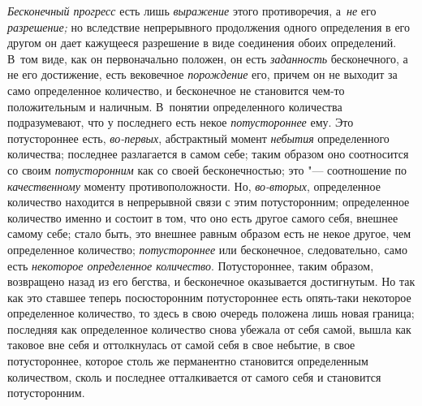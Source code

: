 {\em Бесконечный прогресс} есть лишь {\em выражение} этого противоречия,
а~{\em не} его {\em разрешение;} но вследствие непрерывного продолжения одного
определения в его другом он дает кажущееся разрешение в виде соединения обоих
определений. В~том виде, как он первоначально положен, он есть {\em заданность}
бесконечного, а не его достижение, есть вековечное {\em порождение} его, причем
он не выходит за само определенное количество, и бесконечное не становится
чем-то положительным и наличным. В~понятии определенного количества
подразумевают, что у последнего есть некое {\em потустороннее} ему. Это
потустороннее есть, {\em во-первых}, абстрактный момент {\em небытия}
определенного количества; последнее разлагается в самом себе; таким образом оно
соотносится со своим {\em потусторонним} как со своей бесконечностью; это "---
соотношение по {\em качественному} моменту противоположности. Но,
{\em во-вторых}, определенное количество находится в непрерывной связи с этим
потусторонним; определенное количество именно и состоит в том, что оно есть
другое самого себя, внешнее самому себе; стало быть, это внешнее равным образом
есть не некое другое, чем определенное количество; {\em потустороннее} или
бесконечное, следовательно, само есть {\em некоторое определенное количество}.
Потустороннее, таким образом, возвращено назад из его бегства, и бесконечное
оказывается достигнутым. Но так как это ставшее теперь посюсторонним
потустороннее есть опять-таки некоторое определенное количество, то здесь
в свою очередь положена лишь новая граница; последняя как определенное
количество снова убежала от себя самой, вышла как таковое вне себя и
оттолкнулась от самой себя в свое небытие, в свое потустороннее, которое столь
же перманентно становится определенным количеством, сколь и последнее
отталкивается от самого себя и становится потусторонним.

